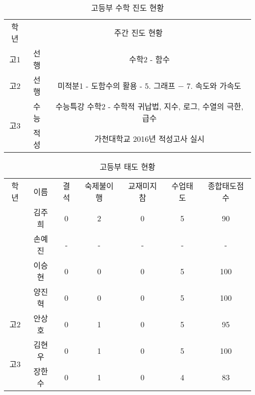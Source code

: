 \documentclass[idxtotoc,hyperref,openany]{labbook} %
\begin{document}


\begin{table}[h]
\centering
\begin{adjustbox}{width=\textwidth}
\begin{tabular}{c||c|c}
\toprule
\midrule
학년 & \multicolumn{2}{c}{주간 진도 현황} \\
\hhline{=||==}
고1 & 선행 & 수학2 - 함수\\
\hline
고2 & 선행 & 미적분1 - 도함수의 활용 - 5. 그래프 $-$ 7. 속도와 가속도\\
\hline
\multirow{2}{*}{고3} & 수능 & 수능특강 수학2 - 수학적 귀납법, 지수, 로그, 수열의 극한, 급수 \\ \hhline{~--}
                     & 적성 & 가천대학교 2016년 적성고사 실시 \\

\hline
\end{tabular}
\end{adjustbox}
\caption{\label{tab:ii} 고등부 수학 진도 현황 }
\end{table}





\begin{table}[H]
\centering
\begin{adjustbox}{width=\textwidth}
\begin{tabular}{c|c||c|c|c|c|c}
\toprule
\midrule
학년 & 이름 & 결석 & 숙제불이행 & 교재미지참 & 수업태도 & 종합태도점수 \\
\hhline{=|=||=|=|=|=|=}
\multirow{4}{*}{고1}			& 김주희 & 0 & 2 & 0 & 5 & 90   \\ \hhline{~------}
					& 손예진 & - & - & - & - & -  \\ \hhline{~------}
					& 이승현 & 0 & 0 & 0 & 5 & 100  \\ \hhline{~------}
					& 양진혁 & 0 & 0 & 0 & 5 & 100 \\
\hline
\multirow{1}{*}{고2}			& 안상호 & 0 & 1 & 0 & 5 & 95	\\ 
\hline
\multirow{2}{*}{고3}			& 김현우 & 0 & 1 & 0 & 5 & 100  \\ \hhline{~------}
					& 장한수 & 0 & 1 & 0 & 4 & 83	\\
\hline
\end{tabular}
\end{adjustbox}
\caption{\label{tab:iii} 고등부 태도 현황 }
\end{table}
\end{document}

